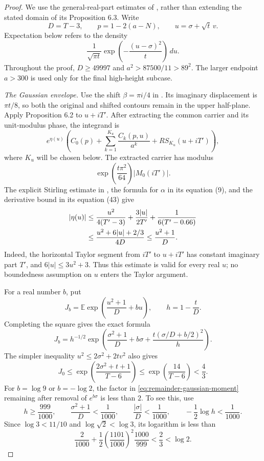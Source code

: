 \documentclass[11pt]{article}
\theoremstyle{remark}
\numberwithin{equation}{section}
\begin{document}
\begin{proof}
We use the general-real-part estimates of
\cite[Proposition 6.2]{polymath}, rather than extending the stated domain
of its Proposition 6.3.  Write
\[
 D=T-3,\qquad p=1-2(a-N),\qquad
 u=\sigma+\sqrt t\,v.
\]
Expectation below refers to the density
\[
 \frac{1}{\sqrt{\pi t}}
 \exp\!\left(-\frac{(u-\sigma)^2}{t}\right)\,du.
\]
Throughout the proof, $D\ge49997$ and
$a^2>87500/11>89^2$. The larger endpoint $a>300$ is used only for the
final high-height subcase.

\emph{The Gaussian envelope.}
Use the shift $\beta=\pi i/4$ in
\cite[equation (41)]{polymath}.  Its imaginary displacement is
$\pi t/8$, so both the original and shifted contours remain in the
upper half-plane.  Apply Proposition 6.2 to $u+iT'$.
After extracting the common carrier and its unit-modulus phase, the
integrand is
\[
 e^{\eta(u)}\left(
 C_0(p)+\sum_{k=1}^{K_u}\frac{C_k(p,u)}{a^k}
                    +RS_{K_u}(u+iT')\right),
\]
where $K_u$ will be chosen below.  The extracted carrier has modulus
\[
 \exp\!\left(\frac{t\pi^2}{64}\right)|M_0(iT')|.
\]
The explicit Stirling estimate in \cite[Lemma 5.1(v)]{polymath}, the
formula for $\alpha$ in its equation (9), and the derivative bound in
its equation (43) give
\begin{align}
 |\eta(u)|
 &\le \frac{u^2}{4(T'-3)}
       +\frac{3|u|}{2T'}+\frac{1}{6(T'-0.66)}\notag\\
 &\le\frac{u^2+6|u|+2/3}{4D}
 \le\frac{u^2+1}{D}.
 \label{eq:remainder-gaussian-envelope}
\end{align}
Indeed, the horizontal Taylor segment from $iT'$ to $u+iT'$ has
constant imaginary part $T'$, and
$6|u|\le3u^2+3$.  Thus this estimate is valid for every real $u$;
no boundedness assumption on $u$ enters the Taylor argument.

For a real number $b$, put
\[
 J_b=\mathbb E\exp\!\left(\frac{u^2+1}{D}+bu\right),
 \qquad h=1-\frac tD.
\]
Completing the square gives the exact formula
\begin{equation}
 \label{eq:remainder-gaussian-moment}
 J_b=h^{-1/2}
 \exp\!\left(\frac{\sigma^2+1}{D}+b\sigma
       +\frac{t(\sigma/D+b/2)^2}{h}\right).
\end{equation}
The simpler inequality $u^2\le2\sigma^2+2tv^2$ also gives
\begin{equation}
 \label{eq:remainder-zero-moment}
 J_0\le
 \exp\!\left(\frac{2\sigma^2+t+1}{T-6}\right)
 \le\exp\!\left(\frac{14}{T-6}\right)<\frac43.
\end{equation}
For $b=\log9$ or $b=-\log2$, the factor in
\eqref{eq:remainder-gaussian-moment} remaining after removal of
$e^{b\sigma}$ is less than $2$.  To see this, use
\[
 h\ge\frac{999}{1000},\qquad
 \frac{\sigma^2+1}{D}<\frac1{1000},\qquad
 \frac{|\sigma|}{D}<\frac1{1000},\qquad
 -\frac12\log h<\frac1{1000}.
\]
Since $\log3<11/10$ and $\log\sqrt2<\log3$, its logarithm is less than
\[
 \frac2{1000}
 +\frac12\left(\frac{1101}{1000}\right)^2\frac{1000}{999}
 <\frac23<\log2.
\]


\end{proof}
\end{document}
